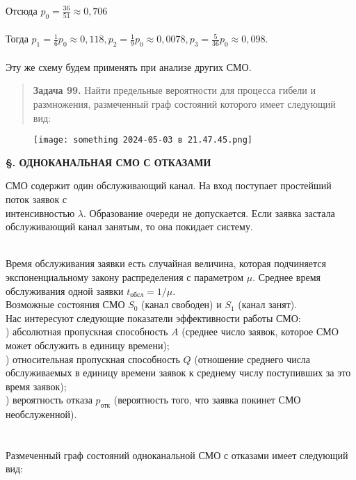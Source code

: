 \documentclass{article}
\begin{document}
\noindent Отсюда $p_0 = \frac{36}{51} \approx 0,706$
\\ \\  \indent Тогда $p_1 = \frac{1}{6}p_0 \approx
0,118, p_2 = \frac{1}{9}p_0 \approx 0,0078, p_3 = \frac{5}{36}p_0 \approx 0,098$.
\\ \\ 
\indent Эту же схему будем применять при анализе других СМО.

\begin{quote}
\textbf{Задача  99.} Найти предельные вероятности для процесса гибели и размножения, размеченный граф состояний которого имеет следующий вид:

\end{quote}
\begin{figure}[h] 
\centering
\texttt{[image: something 2024-05-03 в 21.47.45.png]}
\label{fig:my_label}
\end{figure} 

\vspace{5em} %

\begin{center}
\textbf{\S {}.  ОДНОКАНАЛЬНАЯ СМО С ОТКАЗАМИ}
\end{center}


СМО содержит один обслуживающий канал. На вход поступает простейший поток заявок с \\  интенсивностью $\lambda$. Образование очереди не допускается. Если заявка застала обслуживающий канал занятым, то она покидает систему.

\\ \indent
Время  обслуживания  заявки  есть  случайная  величина,  которая подчиняется  экспоненциальному  закону  распределения  с  параметром $\mu$. Среднее время обслуживания одной заявки $t_{\text{обсл}} =  1/\mu$.\\
\indent Возможные  состояния  СМО $S_0$  (канал  свободен)  и $S_1$ (канал занят). \\ \indent 
Нас  интересуют  следующие  показатели  эффективности  работы СМО: \\  
)  абсолютная  пропускная способность $A$  (среднее число заявок, которое СМО может обслужить в единицу времени); \\ ) относительная  пропускная способность $Q$ (отношение среднего числа обслуживаемых в единицу времени заявок к среднему числу поступивших за это время заявок); \\ )  вероятность отказа $p_{\text{отк}}$   (вероятность того,  что  заявка  покинет СМО необслуженной). \\ \\ \\ \indent Размеченный  граф  состояний  одноканальной  СМО  с  отказами имеет следующий вид:
\end{document}
